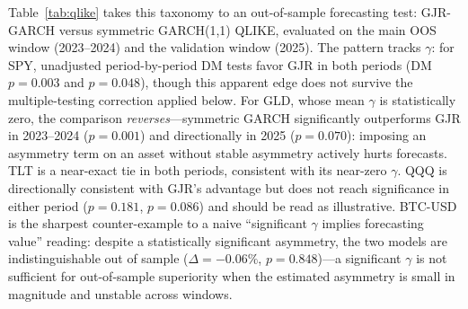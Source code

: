 Table~\ref{tab:qlike} takes this taxonomy to an out-of-sample forecasting test: GJR-GARCH versus symmetric GARCH(1,1) QLIKE, evaluated on the main OOS window (2023--2024) and the validation window (2025).%
The pattern tracks $\gamma$: for SPY, unadjusted period-by-period DM tests favor GJR in both periods (DM $p=0.003$ and $p=0.048$), though this apparent edge does not survive the multiple-testing correction applied below. For GLD, whose mean $\gamma$ is statistically zero, the comparison \emph{reverses}---symmetric GARCH significantly outperforms GJR in 2023--2024 ($p=0.001$) and directionally in 2025 ($p=0.070$): imposing an asymmetry term on an asset without stable asymmetry actively hurts forecasts. TLT is a near-exact tie in both periods, consistent with its near-zero $\gamma$. QQQ is directionally consistent with GJR's advantage but does not reach significance in either period ($p=0.181$, $p=0.086$) and should be read as illustrative. BTC-USD is the sharpest counter-example to a naive ``significant $\gamma$ implies forecasting value'' reading: despite a statistically significant asymmetry, the two models are indistinguishable out of sample ($\Delta=-0.06\%$, $p=0.848$)---a significant $\gamma$ is not sufficient for out-of-sample superiority when the estimated asymmetry is small in magnitude and unstable across windows.

